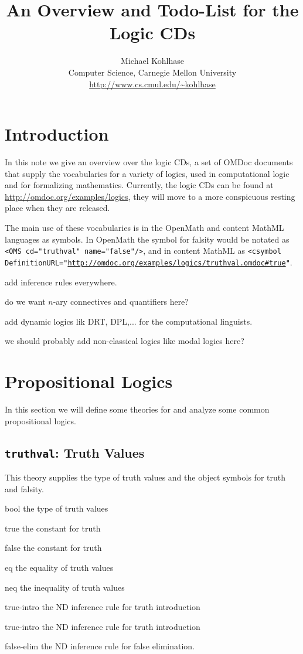 \documentclass{article}
\title{An Overview and Todo-List for the Logic CDs}
\author{Michael Kohlhase\\ 
Computer Science, Carnegie Mellon University\\
\url{http://www.cs.cmul.edu/~kohlhase}}
\def\openmath{{\sc OpenMath}}
\def\omdoc{{\sc OMDoc}}
\def\mathml{{\sc MathML}}
\begin{document}
\maketitle

\section{Introduction}
In this note we give an overview over the logic CDs, a set of {\omdoc} documents
that supply the vocabularies for a variety of logics, used in computational logic
and for formalizing mathematics.  Currently, the logic CDs can be found at
{\url{http://omdoc.org/examples/logics}}, they will move
to a more conspicuous resting place when they are released. 

The main use of these vocabularies is in the {\openmath} and content {\mathml}
languages as symbols. In {\openmath} the symbol for falsity would be notated as 
{\tt{<OMS cd="truthval" name="false"/>}}, and in content {\mathml} as
{\tt{<csymbol DefinitionURL="\url{http://omdoc.org/examples/logics/truthval.omdoc#true}"}}.

\begin{todolist}{}
\item add inference rules everywhere. 
\item do we want $n$-ary connectives and quantifiers here?
\item add dynamic logics lik DRT, DPL,... for the computational linguists.
\item we should probably add non-classical logics like modal logics here?
\end{todolist}

 \section{Propositional Logics}
 In this section we will define some theories for and analyze some common
 propositional logics.

\subsection{{\tt{truthval}}: Truth Values}
This theory supplies the type of truth values and the object symbols for truth and
falsity. 

\begin{constlist}
  \item[bool] the type of truth values
  \item[true] the constant for truth
  \item[false] the constant for truth
  \item[eq] the equality of truth values
  \item[neq] the inequality of truth values
  \item[true-intro] the ND inference rule for truth introduction
  \item[true-intro] the ND inference rule for truth introduction
  \item[false-elim] the ND inference rule for false elimination.
\end{constlist}
  
\end{document}

